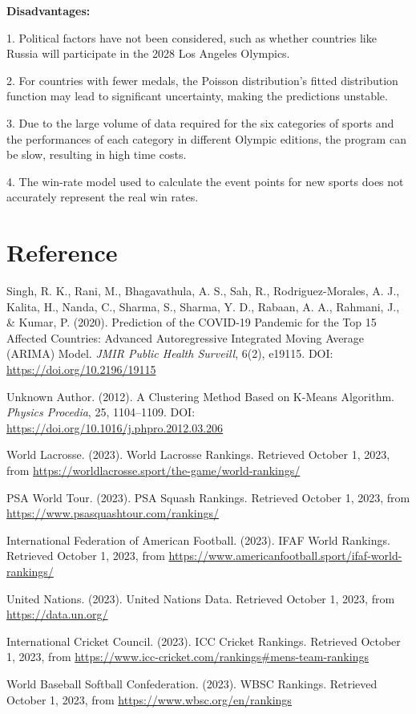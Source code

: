 \documentclass{mcmthesis}  %
\begin{document}
\textbf{Disadvantages:}

1. Political factors have not been considered, such as whether countries like Russia will participate in the 2028 Los Angeles Olympics.

2. For countries with fewer medals, the Poisson distribution's fitted distribution function may lead to significant uncertainty, making the predictions unstable.

3. Due to the large volume of data required for the six categories of sports and the performances of each category in different Olympic editions, the program can be slow, resulting in high time costs.

4. The win-rate model used to calculate the event points for new sports does not accurately represent the real win rates.

\section{Reference}
\begin{thebibliography}{9} %

Singh, R. K., Rani, M., Bhagavathula, A. S., Sah, R., Rodriguez-Morales, A. J., Kalita, H., Nanda, C., Sharma, S., Sharma, Y. D., Rabaan, A. A., Rahmani, J., \& Kumar, P. (2020). 
Prediction of the COVID-19 Pandemic for the Top 15 Affected Countries: Advanced Autoregressive Integrated Moving Average (ARIMA) Model. 
\textit{JMIR Public Health Surveill}, 6(2), e19115. 
DOI: \url{https://doi.org/10.2196/19115}

Unknown Author. (2012). 
A Clustering Method Based on K-Means Algorithm. 
\textit{Physics Procedia}, 25, 1104--1109. 
DOI: \url{https://doi.org/10.1016/j.phpro.2012.03.206}

World Lacrosse. (2023). 
World Lacrosse Rankings. 
Retrieved October 1, 2023, from \url{https://worldlacrosse.sport/the-game/world-rankings/}

PSA World Tour. (2023). 
PSA Squash Rankings. 
Retrieved October 1, 2023, from \url{https://www.psasquashtour.com/rankings/}

International Federation of American Football. (2023). 
IFAF World Rankings. 
Retrieved October 1, 2023, from \url{https://www.americanfootball.sport/ifaf-world-rankings/}

United Nations. (2023). 
United Nations Data. 
Retrieved October 1, 2023, from \url{https://data.un.org/}

International Cricket Council. (2023). 
ICC Cricket Rankings. 
Retrieved October 1, 2023, from \url{https://www.icc-cricket.com/rankings#mens-team-rankings}

World Baseball Softball Confederation. (2023). 
WBSC Rankings. 
Retrieved October 1, 2023, from \url{https://www.wbsc.org/en/rankings}

\end{thebibliography}
\end{document}
